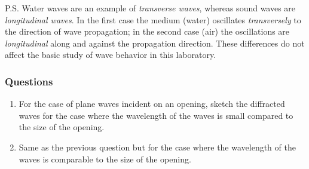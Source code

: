 \documentclass[11pt]{NSF}
\def\ben{\begin{enumerate}}
\def\een{\end{enumerate}}
\def\i{\item{}}
\begin{document}
P.S. Water waves are an example of {\em transverse waves}, 
whereas sound waves are {\em longitudinal waves}. 
In the first case the medium (water) oscillates {\em transversely} to 
the direction of wave propagation; in the second case (air) the 
oscillations are {\em longitudinal} along and against the 
propagation direction. 
These differences do not affect the basic study of wave behavior in this laboratory.

\subsubsection*{Questions}
\ben

\i For the case of plane waves incident on an opening, sketch the 
diffracted waves for the case where the wavelength of the waves is 
small compared to the size of the opening.

\i Same as the previous question but for the case where the 
wavelength of the waves is comparable to the size of the opening.
\een
\end{document}
